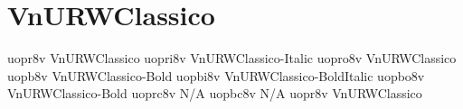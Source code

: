 \documentclass[sample]{vnsample}
\begin{document}
\section{VnURWClassico}
  {uopr8v}   {VnURWClassico}
 {uopri8v}  {VnURWClassico-Italic}
 {uopro8v}  {VnURWClassico}
  {uopb8v}   {VnURWClassico-Bold}
 {uopbi8v}  {VnURWClassico-BoldItalic}
 {uopbo8v}  {VnURWClassico-Bold}
 {uoprc8v}  {N/A}
 {uopbc8v}  {N/A}
  {uopr8v}   {VnURWClassico}
\end{document}

